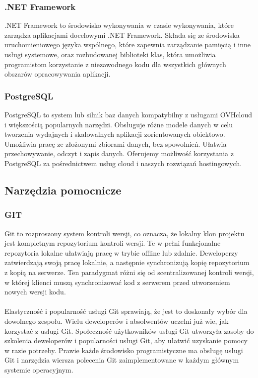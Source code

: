 \documentclass[12pt,a4paper]{article}
\begin{document}
\subsubsection{.NET Framework}
.NET Framework to środowisko wykonywania w czasie wykonywania, które zarządza aplikacjami docelowymi .NET Framework. Składa się ze środowiska uruchomieniowego języka wspólnego, które zapewnia zarządzanie pamięcią i inne usługi systemowe, oraz rozbudowanej biblioteki klas, która umożliwia programistom korzystanie z niezawodnego kodu dla wszystkich głównych obszarów opracowywania aplikacji.

\subsubsection{PostgreSQL}
PostgreSQL to system lub silnik baz danych kompatybilny z usługami OVHcloud i większością popularnych narzędzi. Obsługuje różne modele danych w celu tworzenia wydajnych i skalowalnych aplikacji zorientowanych obiektowo. Umożliwia pracę ze złożonymi zbiorami danych, bez spowolnień. Ułatwia przechowywanie, odczyt i zapis danych. Oferujemy możliwość korzystania z PostgreSQL za pośrednictwem usług cloud i naszych rozwiązań hostingowych.



\subsection{Narzędzia pomocnicze}

\subsubsection{GIT}
Git to rozproszony system kontroli wersji, co oznacza, że lokalny klon projektu jest kompletnym repozytorium kontroli wersji. Te w pełni funkcjonalne repozytoria lokalne ułatwiają pracę w trybie offline lub zdalnie. Deweloperzy zatwierdzają swoją pracę lokalnie, a następnie synchronizują kopię repozytorium z kopią na serwerze. Ten paradygmat różni się od scentralizowanej kontroli wersji, w której klienci muszą synchronizować kod z serwerem przed utworzeniem nowych wersji kodu.
\\\\
Elastyczność i popularność usługi Git sprawiają, że jest to doskonały wybór dla dowolnego zespołu. Wielu deweloperów i absolwentów uczelni już wie, jak korzystać z usługi Git. Społeczność użytkowników usługi Git utworzyła zasoby do szkolenia deweloperów i popularności usługi Git, aby ułatwić uzyskanie pomocy w razie potrzeby. Prawie każde środowisko programistyczne ma obsługę usługi Git i narzędzia wiersza polecenia Git zaimplementowane w każdym głównym systemie operacyjnym.
\end{document}
